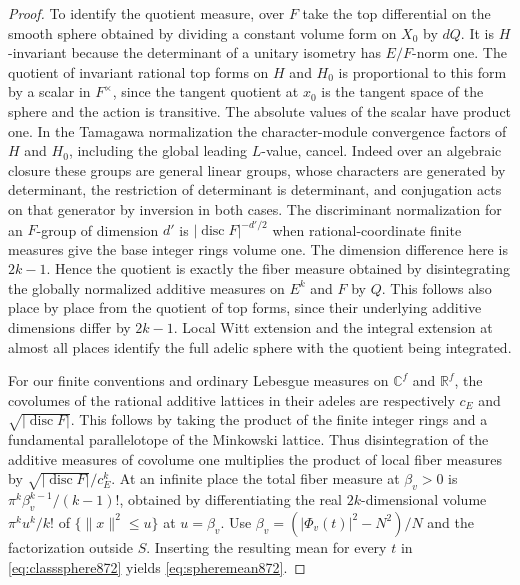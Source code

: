 \documentclass[a4paper,11pt]{article}
\theoremstyle{definition}
\theoremstyle{remark}
\newcommand{\RR}{\mathbb R}\newcommand{\CC}{\mathbb C}\newcommand{\QQ}{\mathbb Q}
\numberwithin{equation}{section}
\begin{document}
\begin{proof}
To identify the quotient measure, over \(F\) take the top
differential on the smooth sphere obtained by dividing a
constant volume form on \(X_0\) by \(dQ\). It is \(H\)-invariant
because the determinant of a unitary isometry has \(E/F\)-norm one.
The quotient of invariant rational top forms on \(H\) and \(H_0\)
is proportional to this form by a scalar in \(F^\times\),
since the tangent quotient at \(x_0\) is the tangent space of
the sphere and the action is transitive. The absolute values
of the scalar have product one. In the Tamagawa normalization
the character-module convergence factors of \(H\) and \(H_0\),
including the global leading \(L\)-value, cancel. Indeed over
an algebraic closure these groups are general linear groups,
whose characters are generated by determinant, the restriction
of determinant is determinant, and conjugation acts on that
generator by inversion in both cases. The discriminant
normalization for an \(F\)-group of dimension \(d'\) is
\(|\operatorname{disc}F|^{-d'/2}\) when rational-coordinate
finite measures give the base integer rings volume one.
The dimension difference here is \(2k-1\). Hence the quotient
is exactly the fiber measure obtained by disintegrating the
globally normalized additive measures on \(E^k\) and \(F\)
by \(Q\). This follows also place by place from the quotient
of top forms, since their underlying additive dimensions
differ by \(2k-1\). Local Witt extension and the integral
extension at almost all places identify the full adelic sphere
with the quotient being integrated.

For our finite conventions and ordinary Lebesgue measures on
\(\CC^f\) and \(\RR^f\), the covolumes of the rational additive
lattices in their adeles are respectively \(c_E\) and
\(\sqrt{|\operatorname{disc}F|}\). This follows by taking
the product of the finite integer rings and a fundamental
parallelotope of the Minkowski lattice. Thus disintegration
of the additive measures of covolume one multiplies the
product of local fiber measures by
\(\sqrt{|\operatorname{disc}F|}/c_E^k\).
At an infinite place the total fiber measure at
\(\beta_v>0\) is
\(\pi^k\beta_v^{k-1}/(k-1)!\), obtained by differentiating the real
\(2k\)-dimensional volume \(\pi^k u^k/k!\) of
\(\{\|x\|^2\le u\}\) at \(u=\beta_v\).
Use \(\beta_v=(|\Phi_v(t)|^2-N^2)/N\) and the factorization
outside \(S\). Inserting the resulting mean for every \(t\)
in \eqref{eq:classsphere872} yields \eqref{eq:spheremean872}.


\end{proof}
\end{document}
